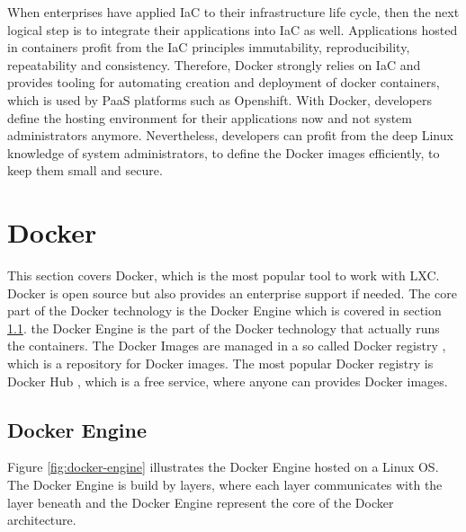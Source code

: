 When enterprises have applied IaC to their infrastructure life cycle, then the next logical step is to integrate their applications into IaC as well. Applications hosted in containers profit from the IaC principles immutability, reproducibility, repeatability and consistency. Therefore, Docker strongly relies on IaC and provides tooling for automating creation and deployment of docker containers, which is used by PaaS platforms such as Openshift. With Docker, developers define the hosting environment for their applications now and not system administrators anymore. Nevertheless, developers can profit from the deep Linux knowledge of system administrators, to define the Docker images efficiently, to keep them small and secure. 

\section{Docker}
\label{sec:docker}
This section covers Docker, which is the most popular tool to work with LXC. Docker is open source but also provides an enterprise support if needed. The core part of the Docker technology is the Docker Engine which is covered in section \ref{sec:docker-engine}. the Docker Engine is the part of the Docker technology that actually runs the containers. The Docker Images are managed in a so called Docker registry \cite{DockerRegistry2018}, which is a repository for Docker images. The most popular Docker registry is Docker Hub \cite{DockerRegistry2018}, which is a free service, where anyone can provides Docker images.

\subsection{Docker Engine}
\label{sec:docker-engine}
Figure \ref{fig:docker-engine} illustrates the Docker Engine hosted on a Linux OS. The Docker Engine is build by layers, where each layer communicates with the layer beneath and the Docker Engine represent the core of the Docker architecture. 

